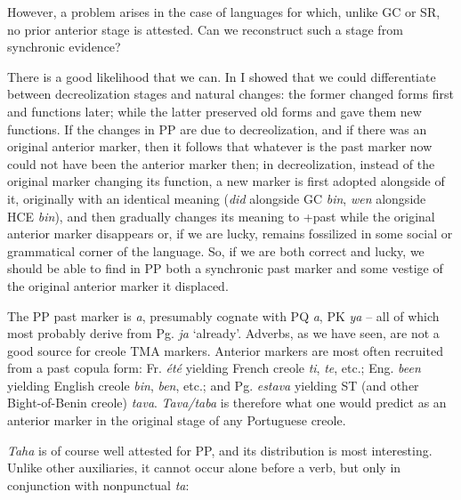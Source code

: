 However, a problem arises in the case of languages for which, unlike GC or SR, no prior anterior stage is attested. Can we reconstruct such a stage from synchronic evidence?

There is a good likelihood that we can. In \citet{Bickerton1980} I showed that we could differentiate between decreolization stages and natural changes: the former changed forms first and functions later; while the latter preserved old forms and gave them new functions. If the changes in PP are due to decreolization, and if there was an original anterior marker, then it follows that whatever is the past
marker now could not have been the anterior marker then; in decreoli\-zation, instead of the original marker changing its function, a new marker is first adopted alongside of it, originally with an identical meaning (\textit{did} alongside GC \textit{bin}, \textit{wen} alongside HCE \textit{bin}), and then gradually changes its meaning to +past while the original anterior marker disappears or, if we are lucky, remains fossilized in some social or grammatical corner of the language. So, if we are both correct and lucky, we should be able to find in PP both a synchronic past marker and some vestige of the original anterior marker it displaced.

The PP past marker is \textit{a}, presumably cognate with PQ \textit{a}, PK \textit{ya} -- all of which most probably derive from Pg. \textit{ja} `already'. Adverbs, as we have seen, are not a good source for creole TMA markers. Anterior markers are most often recruited from a past copula form: Fr. \textit{été} yielding French creole \textit{ti}, \textit{te}, etc.; Eng. \textit{been} yielding English creole \textit{bin}, \textit{ben}, etc.; and Pg. \textit{estava} yielding ST (and other Bight-of-Benin creole) \textit{tava}. \textit{Tava/taba} is therefore what one would predict as an anterior marker in the original stage of any Portuguese creole.

\textit{Taha} is of course well attested for PP, and its distribution is most interesting. Unlike other auxiliaries, it cannot occur alone before a verb, but only in conjunction with nonpunctual \textit{ta}:

\label{ex:2:95}\z

\label{ex:2:96}\z



\label{ex:2:97}\z


